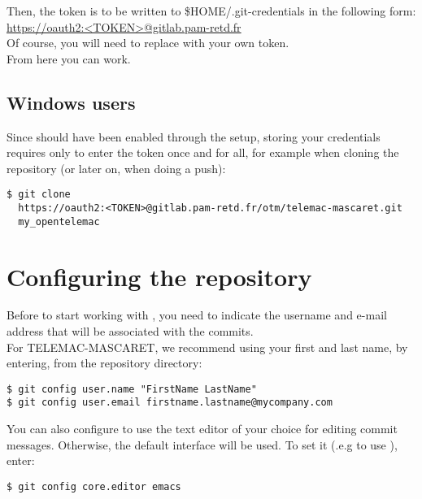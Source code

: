 Then, the token is to be written to \$HOME/.git-credentials in the following
form:\\
\url{https://oauth2:<TOKEN>@gitlab.pam-retd.fr}\\
Of course, you will need to replace  with your own token.\\

From here you can work.

\subsection{Windows users}
Since   should have been enabled
through the  setup, storing your credentials requires only to enter
the token once and for all, for example when cloning the repository (or later
on, when doing a push):

\begin{small}
\begin{lstlisting}
$ git clone
  https://oauth2:<TOKEN>@gitlab.pam-retd.fr/otm/telemac-mascaret.git
  my_opentelemac
\end{lstlisting}
\end{small}

\section{Configuring the repository}
Before to start working with , you need to indicate the username
and e-mail address that will be associated with the commits.\\

For TELEMAC-MASCARET, we recommend using your first and last name, by entering,
from the repository directory:
\begin{small}
\begin{lstlisting}
$ git config user.name "FirstName LastName"
$ git config user.email firstname.lastname@mycompany.com
\end{lstlisting}
\end{small}

You can also configure  to use the text editor of your choice for
editing commit messages. Otherwise, the default  interface will be
used. To set it (.e.g to use ), enter:
\begin{small}
\begin{lstlisting}
$ git config core.editor emacs
\end{lstlisting}
\end{small}

